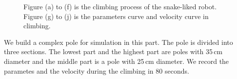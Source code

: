 \begin{figure}[!h]
{	}
	
	
	\caption{Figure (a) to (f) is the climbing process of the snake-liked robot. Figure (g) to (j) is the parameters curve and velocity curve in climbing.}
\end{figure}
We build a complex pole for simulation in this part. The pole is divided into three sections. The lowest part and the highest part are poles with 35\,cm diameter and the middle part is a pole with 25\,cm diameter. We record the parametes and the velocity during the climbing in 80 seconds.

